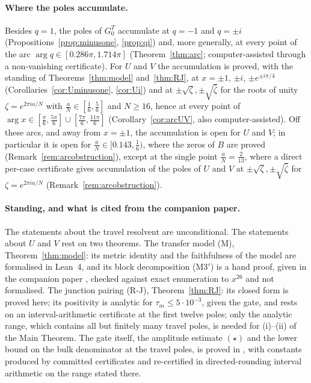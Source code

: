 \documentclass[11pt]{article}
\theoremstyle{plain}
\theoremstyle{definition}
\theoremstyle{remark}
\theoremstyle{plain}\newtheorem*{maintheorem}{Main Theorem}
\begin{document}
\paragraph{Where the poles accumulate.} Besides $q=1$, the poles of $G^T_0$ accumulate at $q=-1$
and $q=\pm i$ (Propositions~\ref{prop:minusone}, \ref{prop:qi}) and, more generally, at every point
of the arc $\arg q\in[0.286\pi,1.714\pi]$ (Theorem~\ref{thm:arc}; computer-assisted through a
non-vanishing certificate). For $U$ and $V$ the accumulation is proved, with the standing of
Theorems~\ref{thm:model} and~\ref{thm:RJ}, at $x=\pm1$, $\pm i$, $\pm e^{\pm i\pi/4}$
(Corollaries~\ref{cor:Uminusone}, \ref{cor:Ui}) and at $\pm\sqrt\zeta,\pm\sqrt{\bar\zeta}$ for the roots
of unity $\zeta=e^{2\pi ia/N}$ with $\frac aN\in[\frac16,\frac56]$ and $N\ge16$, hence at every point of
$\arg x\in[\frac\pi6,\frac{5\pi}6]\cup[\frac{7\pi}6,\frac{11\pi}6]$ (Corollary~\ref{cor:arcUV}, also
computer-assisted). Off these arcs, and away from $x=\pm1$, the accumulation is open for $U$ and $V$; in particular
it is open for $\frac aN\in[0.143,\frac16)$, where the zeros of $B$ are proved (Remark~\ref{rem:arcobstruction}),
except at the single point $\frac aN=\frac2{13}$, where a direct per-case certificate gives accumulation
of the poles of $U$ and $V$ at $\pm\sqrt\zeta,\pm\sqrt{\bar\zeta}$ for $\zeta=e^{2\pi ia/N}$
(Remark~\ref{rem:arcobstruction}).

\paragraph{Standing, and what is cited from the companion paper.} The statements about the travel
resolvent are unconditional. The statements about $U$ and $V$ rest on two theorems. The transfer
model \textup{(M)}, Theorem~\ref{thm:model}: its metric identity and the faithfulness of the model
are formalised in Lean~4, and its block decomposition \textup{(M3$'$)} is a hand proof, given in the
companion paper \cite{Bonfioli2026bB}, checked against exact enumeration to $x^{26}$ and not
formalised. The junction pairing \textup{(R-J)}, Theorem~\ref{thm:RJ}: its closed form is proved
here; its positivity is analytic for $\tau_m\le5\cdot10^{-3}$, given the gate, and rests on an
interval-arithmetic certificate at the first twelve poles; only the analytic range, which contains
all but finitely many travel poles, is needed for (i)--(ii) of the Main Theorem. The gate itself,
the amplitude estimate $(\star)$ and the lower bound on the bulk denominator at the travel poles,
is proved in \cite{Bonfioli2026bB}, with constants produced by committed certificates and
re-certified in directed-rounding interval arithmetic on the range stated there.
\end{document}
